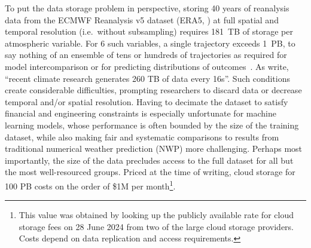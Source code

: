 To put the data storage problem in perspective, storing 40 years of reanalysis data from the ECMWF Reanalysis v5 dataset (ERA5, \citet{hersbach2020era5}) at full spatial and temporal resolution (i.e.\ without subsampling)
requires 181~TB of storage per atmospheric variable.
For 6 such variables, a single trajectory exceeds 1~PB, to say nothing of an ensemble of tens or hundreds of trajectories as required for model intercomparison or for predicting distributions of outcomes~\citep{eyring2016overview}. %
As \citet{sz3_framework} write, ``recent climate research generates 260 TB of data every 16s''. %
%
Such conditions create considerable difficulties, prompting researchers to discard data or decrease temporal and/or spatial resolution. 
%
Having to decimate the dataset to satisfy financial and engineering constraints is especially unfortunate for machine learning models, whose performance is often bounded by the size of the training dataset,
while also making fair and systematic comparisons to results from traditional numerical weather prediction (NWP) more challenging.
%
%
Perhaps most importantly, the size of the data precludes access to the full dataset for all but the most well-resourced groups. %
Priced at the time of writing, cloud storage for 100 PB costs on the order of \$1M per month\footnote{This value was obtained by looking up the publicly available rate for cloud storage fees on 28 June 2024 from two of the large cloud storage providers. Costs depend on data replication and access requirements.}.

